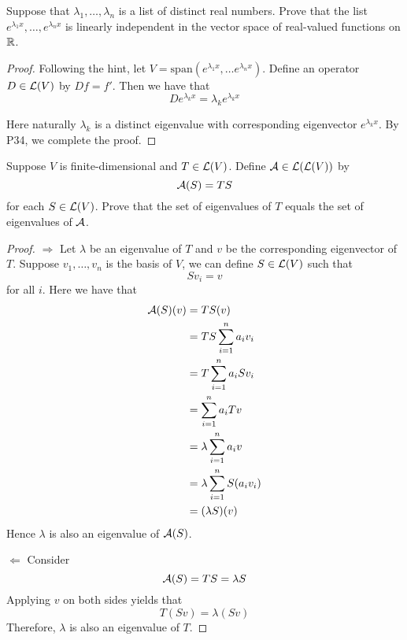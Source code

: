\documentclass{extarticle}
\begin{document}
\begin{problem}{35}
    Suppose that \(\lambda_1, \ldots, \lambda_n\) is a list of distinct real numbers. Prove that 
    the list \(e^{\lambda_1 x}, \ldots, e^{\lambda_n x}\) is linearly independent in the vector 
    space of real-valued functions on \(\mathbb{R}\).
\end{problem}

\begin{proof}
Following the hint, let \(V = \text{span}(e^{\lambda_1 x}, \ldots e^{\lambda_n x})\). Define 
an operator \(D \in \mathcal{L}(V)\) by \(Df = f'\). Then we have that 
\[D e^{\lambda_k x} = \lambda_k e^{\lambda_k x}\]

Here naturally \(\lambda_k\) is a distinct eigenvalue with corresponding eigenvector \(e^{\lambda_k x}\). 
By P34, we complete the proof. 
\end{proof}

\begin{problem}{37}
    Suppose \(V\) is finite-dimensional and \(T \in \mathcal{L}(V)\). Define \(\mathcal{A} \in \mathcal{L}(\mathcal{L}(V))\) by 
    \[\mathcal{A}(S) = TS\]
    for each \(S \in \mathcal{L}(V)\). Prove that the set of eigenvalues of \(T\) equals the set of 
    eigenvalues of \(\mathcal{A}\).
\end{problem}

\begin{proof}
    \(\Rightarrow\) Let \(\lambda\) be an eigenvalue of \(T\) and \(v\) be the corresponding 
    eigenvector of \(T\).  Suppose \(v_1, \ldots, v_n\) is the basis of \(V\), we can define 
    \(S \in \mathcal{L}(V)\) such that 
    \[S v_i = v\]
    for all \(i\). Here we have that 
    \begin{align*}
        \mathcal{A}(S)(v) 
        &= TS(v) \\ 
        &= TS \sum_{i=1}^{n} a_i v_i \\ 
        &= T\sum_{i=1}^{n} a_i Sv_i \\ 
        &= \sum_{i=1}^{n} a_i Tv \\ 
        &= \lambda \sum_{i=1}^{n} a_i v  \\ 
        &= \lambda \sum_{i=1}^{n} S (a_i v_i) \\ 
        &= (\lambda S) (v) 
    \end{align*}
    Hence \(\lambda\) is also an eigenvalue of \(\mathcal{A}(S)\).


    \(\Leftarrow\) Consider 
    \[\mathcal{A}(S) = TS = \lambda S\] 
    Applying \(v\) on both sides yields that 
    \[T(Sv) = \lambda(Sv)\]
    Therefore, \(\lambda\) is also an eigenvalue of \(T\).
\end{proof}
\end{document}
